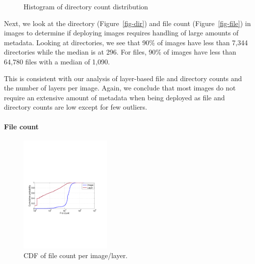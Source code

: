 \begin{figure}[!t]
	\centering
	\caption{Histogram of directory count distribution}
	\label{fig:reference-cnt}
\end{figure}

Next, we look at the directory (Figure~\ref{fig-dir}) and file count
(Figure~\ref{fig-file}) in images to determine if deploying images requires
handling of large amounts of metadata. Looking at directories, we see that 90\%
of images have less than 7,344 directories while the median is at 296. For
files, 90\% of images have less than 64,780 files with a median of 1,090.

This is consistent with our analysis of layer-based file and directory counts
and the number of layers per image. Again, we conclude that most images do not
require an extensive amount of metadata when being deployed as file and
directory counts are low except for few outliers.

\paragraph{File count} 
\begin{figure}
	\centering
	\includegraphics[width=0.4\textwidth]{graphs/file-cnt-cdf.pdf}
	\caption{CDF of file count per image/layer.
	}
	\label{fig:reference-cnt}
\end{figure}


